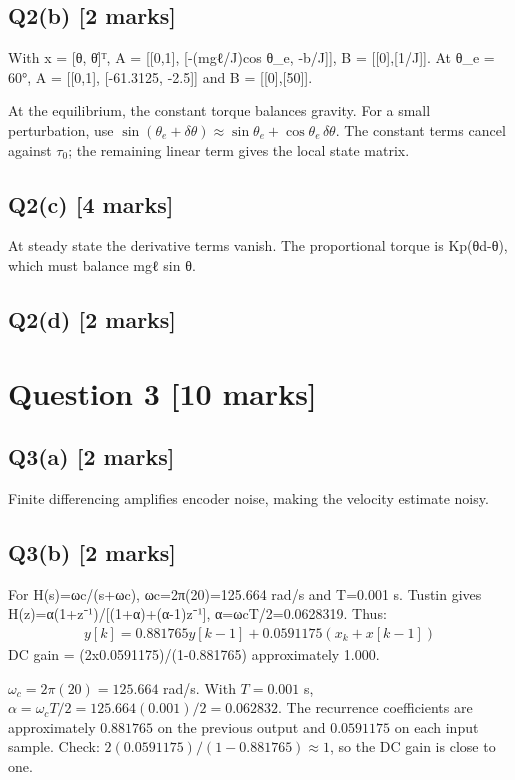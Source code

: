 \documentclass[11pt,a4paper]{article}
\begin{document}
\subsection*{Q2(b) \hfill [2 marks]}

With x = [θ, θ̇]ᵀ, A = [[0,1], [-(mgℓ/J)cos θ\_e, -b/J]], B = [[0],[1/J]].
At θ\_e = 60°, A = [[0,1], [-61.3125, -2.5]] and B = [[0],[50]].\par\smallskip At the equilibrium, the constant torque balances gravity. For a small perturbation, use $\sin(\theta_e+\delta\theta)\approx\sin\theta_e+\cos\theta_e\,\delta\theta$. The constant terms cancel against $\tau_0$; the remaining linear term gives the local state matrix.

\subsection*{Q2(c) \hfill [4 marks]}

At steady state the derivative terms vanish.
The proportional torque is Kp(θd-θ), which must balance mgℓ sin θ.

\subsection*{Q2(d) \hfill [2 marks]}

\vspace{2mm}

\section*{Question 3 \hfill [10 marks]}
\subsection*{Q3(a) \hfill [2 marks]}

Finite differencing amplifies encoder noise, making the velocity estimate noisy.

\subsection*{Q3(b) \hfill [2 marks]}

For H(s)=ωc/(s+ωc), ωc=2π(20)=125.664 rad/s and T=0.001 s.
Tustin gives H(z)=α(1+z⁻¹)/[(1+α)+(α-1)z⁻¹], α=ωcT/2=0.0628319.
Thus:\[\begin{aligned}y[k]=0.881765y[k-1]+0.0591175(x_k+x[k-1])\end{aligned}\]
DC gain = (2x0.0591175)/(1-0.881765) approximately 1.000.\par\smallskip $\omega_c=2\pi(20)=125.664$ rad/s. With $T=0.001$ s, $\alpha=\omega_cT/2=125.664(0.001)/2=0.062832$. The recurrence coefficients are approximately $0.881765$ on the previous output and $0.0591175$ on each input sample. Check: $2(0.0591175)/(1-0.881765)\approx1$, so the DC gain is close to one.
\end{document}
